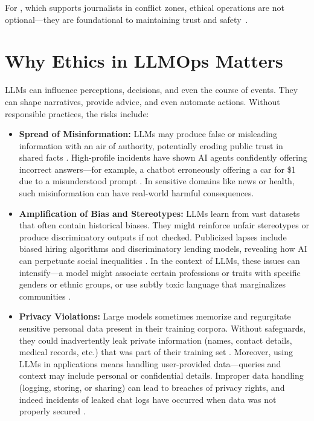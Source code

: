 For \ishtar{}, which supports journalists in conflict zones, ethical operations are not optional---they are foundational to maintaining trust and safety~\cite{ward2020}.

\section{Why Ethics in LLMOps Matters}\label{sec:ethics-why}

LLMs can influence perceptions, decisions, and even the course of events. They can shape narratives, provide advice, and even automate actions. Without responsible practices, the risks include:

\begin{itemize}
    \item \textbf{Spread of Misinformation:} LLMs may produce false or misleading information with an air of authority, potentially eroding public trust in shared facts \cite{ar5iv_labs,bcg2023}. High-profile incidents have shown AI agents confidently offering incorrect answers---for example, a chatbot erroneously offering a car for \$1 due to a misunderstood prompt \cite{bcg2023}. In sensitive domains like news or health, such misinformation can have real-world harmful consequences.

    \item \textbf{Amplification of Bias and Stereotypes:} LLMs learn from vast datasets that often contain historical biases. They might reinforce unfair stereotypes or produce discriminatory outputs if not checked. Publicized lapses include biased hiring algorithms and discriminatory lending models, revealing how AI can perpetuate social inequalities \cite{bcg2023}. In the context of LLMs, these issues can intensify---a model might associate certain professions or traits with specific genders or ethnic groups, or use subtly toxic language that marginalizes communities \cite{ar5iv_labs}.

    \item \textbf{Privacy Violations:} Large models sometimes memorize and regurgitate sensitive personal data present in their training corpora. Without safeguards, they could inadvertently leak private information (names, contact details, medical records, etc.) that was part of their training set \cite{ar5iv_labs}. Moreover, using LLMs in applications means handling user-provided data---queries and context may include personal or confidential details. Improper data handling (logging, storing, or sharing) can lead to breaches of privacy rights, and indeed incidents of leaked chat logs have occurred when data was not properly secured \cite{edpb2022}.


\end{itemize}

